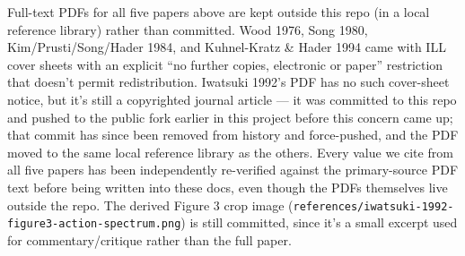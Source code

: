 \documentclass[
]{article}
\begin{document}
Full-text PDFs for all five papers above are kept outside this repo (in
a local reference library) rather than committed. Wood 1976, Song 1980,
Kim/Prusti/Song/Hader 1984, and Kuhnel-Kratz \& Hader 1994 came with ILL
cover sheets with an explicit ``no further copies, electronic or paper''
restriction that doesn't permit redistribution. Iwatsuki 1992's PDF has
no such cover-sheet notice, but it's still a copyrighted journal article
--- it was committed to this repo and pushed to the public fork earlier
in this project before this concern came up; that commit has since been
removed from history and force-pushed, and the PDF moved to the same
local reference library as the others. Every value we cite from all five
papers has been independently re-verified against the primary-source PDF
text before being written into these docs, even though the PDFs
themselves live outside the repo. The derived Figure 3 crop image
(\texttt{references/iwatsuki-1992-figure3-action-spectrum.png}) is still
committed, since it's a small excerpt used for commentary/critique
rather than the full paper.
\end{document}
